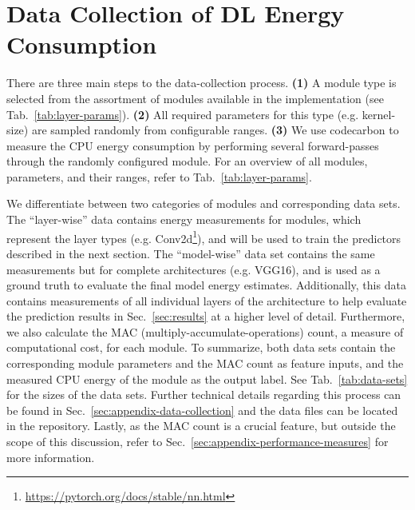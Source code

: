 \section{Data Collection of DL Energy Consumption}
\label{sec:data-collection}
There are three main steps to the data-collection process. \textbf{(1)} A module type is selected from the assortment of modules available in the implementation (see Tab.~\ref{tab:layer-params}). \textbf{(2)} All required parameters for this type (e.g. kernel-size) are sampled randomly from configurable ranges. \textbf{(3)} We use codecarbon to measure the CPU energy consumption by performing several forward-passes through the randomly configured module. For an overview of all modules, parameters, and their ranges, refer to Tab.~\ref{tab:layer-params}.

We differentiate between two categories of modules and corresponding data sets. The ``layer-wise'' data contains energy measurements for modules, which represent the layer types (e.g. Conv2d\footnote{\url{https://pytorch.org/docs/stable/nn.html}}), and will be used to train the predictors described in the next section. The ``model-wise'' data set contains the same measurements but for complete architectures (e.g. VGG16), and is used as a ground truth to evaluate the final model energy estimates. Additionally, this data contains measurements of all individual layers of the architecture to help evaluate the prediction results in Sec.~\ref{sec:results} at a higher level of detail. Furthermore, we also calculate the MAC (multiply-accumulate-operations) count, a measure of computational cost, for each module. To summarize, both data sets contain the corresponding module parameters and the MAC count as feature inputs, and the measured CPU energy of the module as the output label. See Tab.~\ref{tab:data-sets} for the sizes of the data sets. Further technical details regarding this process can be found in Sec.~\ref{sec:appendix-data-collection} and the data files can be located in the repository. Lastly, as the MAC count is a crucial feature, but outside the scope of this discussion, refer to Sec.~\ref{sec:appendix-performance-measures} for more information. 
